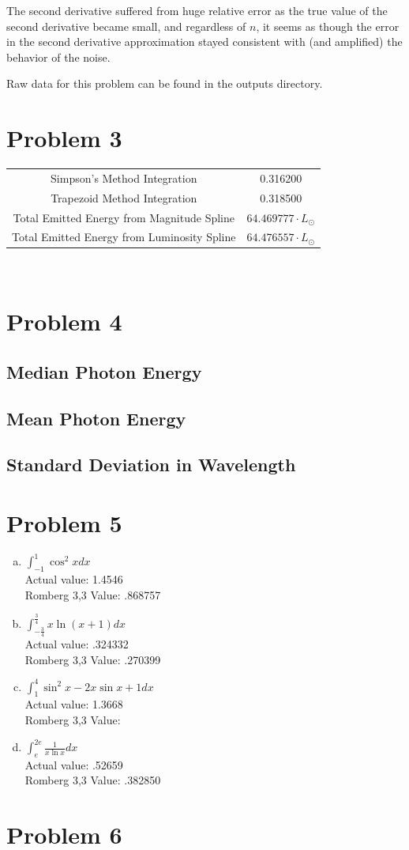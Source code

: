 \documentclass[11pt]{article} %
\begin{document}
The second derivative suffered from huge relative error as the true value of the second derivative became small, and regardless of $n$, it seems as though the error in the second derivative approximation stayed consistent with (and amplified) the behavior of the noise.

Raw data for this problem can be found in the outputs directory.

\section*{Problem 3}
\begin{tabular}{c c}
Simpson's Method Integration & 0.316200 \\
Trapezoid Method Integration & 0.318500 \\
Total Emitted Energy from Magnitude Spline & $64.469777\cdot L_\odot$\\
Total Emitted Energy from Luminosity Spline & $64.476557\cdot L_\odot$\\
\end{tabular}\\


\section*{Problem 4}

\subsection*{Median Photon Energy}
\subsection*{Mean Photon Energy}
\subsection*{Standard Deviation in Wavelength}


\section*{Problem 5}
\begin{enumerate}[a.)]
\item $\int_{-1}^{1} \cos^2xdx$\\
Actual value: 1.4546 \\
Romberg 3,3 Value: .868757

\item $\int_{-\frac{3}{4}}^{\frac{3}{4}} x \ln(x+1) dx$\\
Actual value: .324332 \\
Romberg 3,3 Value: .270399

\item $\int_{1}^{4} \sin^2x - 2x\sin x +1 dx$\\
Actual value: 1.3668 \\
Romberg 3,3 Value: 

\item $\int_{e}^{2e} \frac{1}{x\ln x}dx$\\
Actual value: .52659\\
Romberg 3,3 Value: .382850
\end{enumerate}

\section*{Problem 6}
\end{document}
